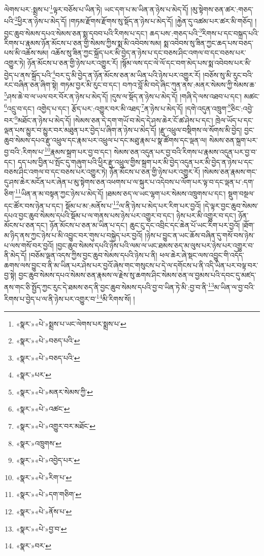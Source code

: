 ལེགས་པར་:སྨྲས་པ་\footnote{«སྣར་»«པེ་»སྨྲས་པ་ཡང་ལེགས་པར་སྨྲས་པ་}ལྟར་བཅོས་པ་ཡིན་ཏེ། ཡང་དག་པ་མ་ཡིན་ན་ཉེས་པ་མེད་དོ། །མུ་སྟེགས་ཅན་ཚར་:གཅད་པའི་\footnote{«སྣར་»«པེ་»བཅད་པའི་}ཕྱིར་ན་ཉེས་པ་མེད་དོ། །གཏམ་རྫོགས་རྫོགས་སུ་སྡོད་ན་ཉེས་པ་མེད་དོ། །རྐྱེན་དུ་འཚམ་པར་ཚར་མི་གཅོད། །བྱང་ཆུབ་སེམས་དཔའ་སེམས་ཅན་སྨ་དབབ་པའི་རིགས་པ་དང་། ཆད་པས་:གཅད་པའི་\footnote{«སྣར་»«པེ་»བཅད་པའི་}རིགས་པ་དང་བསྐྲད་པའི་རིགས་པ་རྣམས་ཉོན་མོངས་པ་ཅན་གྱི་སེམས་ཀྱིས་སྨ་མི་འབེབས་སམ། སྨ་འབེབས་སུ་ཟིན་ཀྱང་ཆད་པས་བཅད་པས་མི་འཆོས་སམ། འཆོས་སུ་ཟིན་ཀྱང་སྐྲོད་པར་མི་བྱེད་ན་ཉེས་པ་དང་བཅས་ཤིང་འགལ་བ་དང་བཅས་པར་འགྱུར་ཏེ། ཉོན་མོངས་པ་ཅན་གྱི་ཉེས་པར་འགྱུར་རོ། །སྙོམ་ལས་དང་ལེ་ལོ་དང་བག་མེད་པས་སྨ་འབེབས་པར་མི་བྱེད་པ་ནས་སྐྲོད་པའི་\footnote{«སྣར་»པར་}བར་དུ་མི་བྱེད་ན་ཉོན་མོངས་ཅན་མ་ཡིན་པའི་ཉེས་པར་འགྱུར་རོ། །བཅོས་སུ་མི་རུང་བའི་རང་བཞིན་ཅན་ཞིག་སྟེ། གཏམ་བྱར་མི་རུང་བ་དང་། བཀའ་བློ་མི་བདེ་ཞིང་ཀུན་ནས་:མནར་སེམས་ཀྱི་སེམས་ཆ་\footnote{«སྣར་»«པེ་»མནར་སེམས་ཀྱི་}ཤས་ཆེ་བ་ལ་ཡལ་བར་བོར་ན་ཉེས་པ་མེད་དོ། །དུས་ལ་སྡོད་ན་ཉེས་པ་མེད་དོ། །གཞི་དེ་ལས་འཐབ་པ་དང་། མཚང་\footnote{«སྣར་»«པེ་»འཚང་}འདྲུ་བ་དང་། འགྱེད་པ་དང་། རྩོད་པར་:འགྱུར་བར་མི་འཐད་\footnote{«སྣར་»«པེ་»འགྱུར་བར་མཐོང་}ན་ཉེས་པ་མེད་དོ། །དགེ་འདུན་འཁྲུག་\footnote{«སྣར་»འཁྲུགས་}ཅིང་:འབྱེ་བར་\footnote{«སྣར་»«པེ་»འབྱེད་པར་}མཐོང་ན་ཉེས་པ་མེད་དོ། །སེམས་ཅན་དེ་དག་གཡོ་བ་མེད་དེ་ཤས་ཆེར་ངོ་ཚ་ཤེས་པ་དང་། ཁྲེལ་ཡོད་པ་དང་ལྡན་པས་མྱུར་བ་མྱུར་བར་མཐུན་པར་བྱེད་པ་ཞིག་ན་ཉེས་པ་མེད་དོ། །རྫུ་འཕྲུལ་བསྡིགས་ལ་སོགས་མི་བྱེད། བྱང་ཆུབ་སེམས་དཔའ་རྫུ་འཕྲུལ་དང་རྣམ་པར་འཕྲུལ་པ་དང་མཐུ་རྣམ་པ་སྣ་ཚོགས་དང་ལྡན་ལ། སེམས་ཅན་སྐྲག་པར་བྱ་བའི་:རིགས་པ་\footnote{«སྣར་»«པེ་»རིག་པ་}རྣམས་སྐྲག་པར་བྱ་བ་དང་། སེམས་ཅན་འདུན་པར་བྱ་བའི་རིགས་པ་རྣམས་འདུན་པར་བྱ་བ་དང་། དད་པས་བྱིན་པ་སྤོང་དུ་གཞུག་པའི་ཕྱིར་རྫུ་འཕྲུལ་གྱིས་སྐྲག་པར་མི་བྱེད་འདུན་པར་མི་བྱེད་ན་ཉེས་པ་དང་བཅས་ཤིང་འགལ་བ་དང་བཅས་པར་འགྱུར་ཏེ། ཉོན་མོངས་པ་ཅན་གྱི་ཉེས་པར་འགྱུར་རོ། །སེམས་ཅན་རྣམས་གང་དུ་ཤས་ཆེར་མངོན་པར་ཞེན་པ་མུ་སྟེགས་ཅན་འཕགས་པ་ལ་སྐུར་པ་འདེབས་པ་ལོག་པར་ལྟ་བ་དང་ལྡན་པ་:དག་ཅིག་\footnote{«སྣར་»«པེ་»དག་གཅིག་}ཡིན་ན་མ་བསྟན་ཀྱང་ཉེས་པ་མེད་དོ། །ཐམས་ཅད་ལ་ཡང་ལྷག་པར་སེམས་འཁྲུགས་པ་དང་། སྡུག་བསྔལ་དང་ཚོར་བས་ཉེན་པ་དང་། སྡོམ་པ་མ་:མནོས་པ་\footnote{«སྣར་»«པེ་»ནོས་པ་}ལ་ནི་ཉེས་པ་མེད་པར་རིག་པར་བྱའོ། །དེ་ལྟར་བྱང་ཆུབ་སེམས་དཔའ་བྱང་ཆུབ་སེམས་དཔའི་སྡོམ་པ་ལ་གནས་པས་ཉེས་པར་འགྱུར་བ་དང་། ཉེས་པར་མི་འགྱུར་བ་དང་། ཉོན་མོངས་པ་ཅན་དང་། ཉོན་མོངས་པ་ཅན་མ་ཡིན་པ་དང་། ཆུང་ངུ་དང་འབྲིང་དང་ཆེན་པོ་ཡང་རིག་པར་བྱའོ། །ཐོག་མ་ཉིད་ནས་ཀྱང་ཉེས་པ་མི་འབྱུང་བར་གུས་པ་བསྐྱེད་པར་བྱའོ། །ཉེས་པ་བྱུང་ན་ཡང་ཆོས་བཞིན་དུ་གསོ་བས་ཉེས་པ་ལས་གསོ་བར་བྱའོ། །བྱང་ཆུབ་སེམས་དཔའི་ཉེས་པའི་ལམ་ལ་ཡང་ཐམས་ཅད་མ་ལུས་པར་ཉེས་པར་འགྱུར་བ་ནི་མེད་དོ། །བཅོམ་ལྡན་འདས་ཀྱིས་བྱང་ཆུབ་སེམས་དཔའི་ཉེས་པ་ནི། ཕལ་ཆེར་ཞེ་སྡང་ལས་འབྱུང་གི་འདོད་ཆགས་ལས་བྱུང་བ་ནི་མ་ཡིན་པར་ཤེས་པར་བྱའོ་ཞེས་གང་གསུངས་པ་དེ་ལ་དགོངས་པ་ནི་འདི་ཡིན་པར་བལྟ་བར་བྱ་སྟེ། བྱང་ཆུབ་སེམས་དཔའ་སེམས་ཅན་རྣམས་ལ་རྗེས་སུ་ཆགས་ཤིང་སེམས་ཅན་ལ་བྱམས་པའི་དབང་དུ་མཛད་ནས་གང་ཅི་སྤྱོད་ཀྱང་རུང་དེ་ཐམས་ཅད་ནི་བྱང་ཆུབ་སེམས་དཔའི་བྱ་བ་ཡིན་ཏེ་མི་:བྱ་བ་ནི་\footnote{«སྣར་»«པེ་»བྱ་བ་}མ་ཡིན་ལ་བྱ་བའི་རིགས་པ་བྱེད་པ་ལ་ནི་ཉེས་པར་འགྱུར་བ་\footnote{«སྣར་»བར་}མི་རིགས་སོ། །

